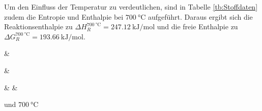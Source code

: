 Um den Einfluss der Temperatur zu verdeutlichen, sind in Tabelle \ref{tb:Stoffdaten} zudem die Entropie und Enthalpie bei $\SI{700}{\degreeCelsius}$ aufgeführt. Daraus ergibt sich die Reaktionsenthalpie zu $\Delta H^{\SI{700}{\degreeCelsius}}_R = \SI{247,12}{\kilo\J\per\mol}$ und die freie Enthalpie zu $\Delta G^{\SI{700}{\degreeCelsius}}_R = \SI{193,66}{\kilo\J\per\mol}$.

 &

 &

& 
		 &
		
		 und $\SI{700}{\degreeCelsius}$ \citep{informatics_nist_nodate}